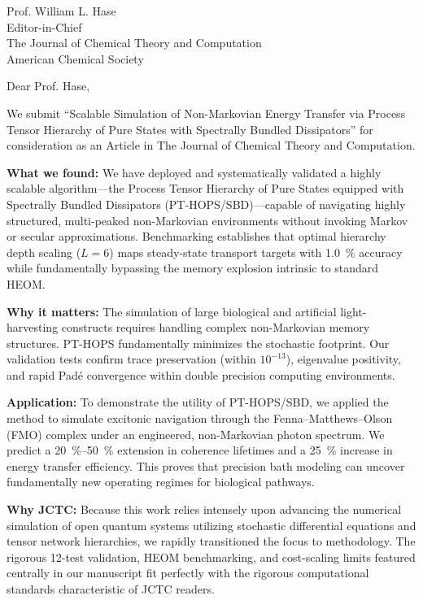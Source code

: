 \documentclass[11pt,a4paper]{letter}
\begin{document}
\begin{letter}{
Prof. William L. Hase \\
Editor-in-Chief\\
The Journal of Chemical Theory and Computation\\
American Chemical Society
}

\opening{Dear Prof. Hase,}

We submit ``Scalable Simulation of Non-Markovian Energy Transfer via Process Tensor Hierarchy of Pure States with Spectrally Bundled Dissipators'' for consideration as an Article in The Journal of Chemical Theory and Computation.

\textbf{What we found:} We have deployed and systematically validated a highly scalable algorithm---the Process Tensor Hierarchy of Pure States equipped with Spectrally Bundled Dissipators (PT-HOPS/SBD)---capable of navigating highly structured, multi-peaked non-Markovian environments without invoking Markov or secular approximations. Benchmarking establishes that optimal hierarchy depth scaling ($L=6$) maps steady-state transport targets with \SI{1.0}{\percent} accuracy while fundamentally bypassing the memory explosion intrinsic to standard HEOM. 

\textbf{Why it matters:} The simulation of large biological and artificial light-harvesting constructs requires handling complex non-Markovian memory structures. PT-HOPS fundamentally minimizes the stochastic footprint. Our validation tests confirm trace preservation (within $10^{-13}$), eigenvalue positivity, and rapid Padé convergence within double precision computing environments. 

\textbf{Application:} To demonstrate the utility of PT-HOPS/SBD, we applied the method to simulate excitonic navigation through the Fenna--Matthews--Olson (FMO) complex under an engineered, non-Markovian photon spectrum. We predict a \SIrange{20}{50}{\percent} extension in coherence lifetimes and a \SI{25}{\percent} increase in energy transfer efficiency. This proves that precision bath modeling can uncover fundamentally new operating regimes for biological pathways.

\textbf{Why JCTC:} Because this work relies intensely upon advancing the numerical simulation of open quantum systems utilizing stochastic differential equations and tensor network hierarchies, we rapidly transitioned the focus to methodology. The rigorous 12-test validation, HEOM benchmarking, and cost-scaling limits featured centrally in our manuscript fit perfectly with the rigorous computational standards characteristic of JCTC readers.


\end{letter}
\end{document}

